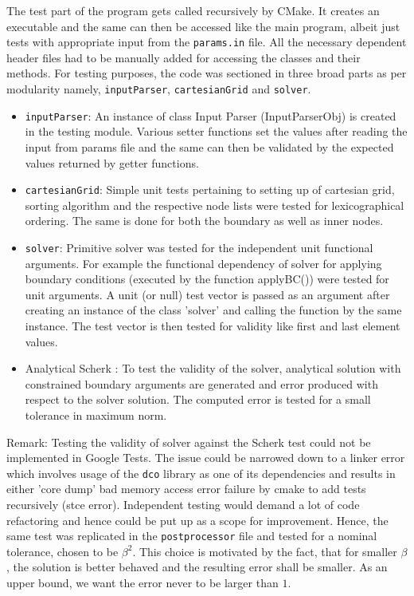\documentclass[11pt]{scrartcl}
\begin{document}
The test part of the program gets called recursively by CMake. It creates an executable and the same can then be accessed like the main program, albeit just tests with appropriate input from the \texttt{params.in} file. All the necessary dependent header files  had to be manually added for accessing the classes and their methods.
For testing purposes, the code was sectioned in three broad parts as per modularity namely, \texttt{inputParser}, \texttt{cartesianGrid} and \texttt{solver}.  
\begin{itemize}
  \item \texttt{inputParser}: An instance of class Input Parser (InputParserObj) is created in the testing module. Various setter functions set the values after reading the input from params file and the same can then be validated by the expected values returned by getter functions.
  \item \texttt{cartesianGrid}: Simple unit tests pertaining to setting up of cartesian grid, sorting algorithm and the respective node lists were tested for lexicographical ordering. The same is done for both the boundary as well as inner nodes.
 \item \texttt{solver}: Primitive solver was tested for the independent unit functional arguments. For example the functional dependency of solver for applying boundary conditions (executed by the function applyBC()) were tested for unit arguments. A unit (or null) test vector is passed as an argument after creating an instance of the class 'solver' and calling the function by the same instance. The test vector is then tested for validity like first and last element  values.  
 \item Analytical Scherk : To test the validity of the solver, analytical solution with constrained boundary arguments are generated and error produced with respect to the solver solution. The computed error is tested for a small tolerance in maximum norm.
\end{itemize}

Remark: Testing the validity of solver against the Scherk test could not be implemented in Google Tests. The issue could be narrowed down to a linker error which involves usage of the \texttt{dco} library as one of its dependencies and results in either 'core dump' bad memory access error failure by cmake to add tests recursively (stce error). Independent testing would demand a lot of code refactoring and hence could be put up as a scope for improvement. Hence, the same test was replicated in the \texttt{postprocessor} file and tested for a nominal tolerance, chosen to be $\beta^2$. This choice is motivated by the fact, that for smaller $\beta$, the solution is better behaved and the resulting error shall be smaller. As an upper bound, we want the error never to be larger than $1$.  
\end{document}
